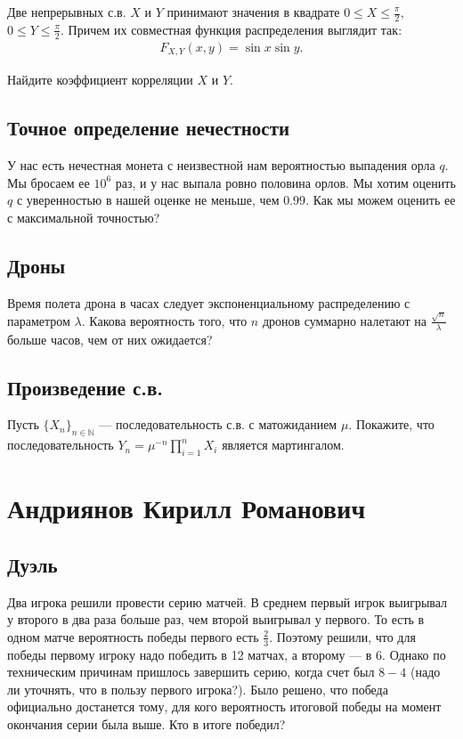 \documentclass[12pt]{article}
\newcommand\N{\mathbb{N}}
\begin{document}
Две непрерывных с.в. $X$ и $Y$ принимают значения в квадрате $0 \le X \le \frac{\pi}{2},$ $0 \le Y \le \frac{\pi}{2}$. Причем их совместная функция распределения выглядит так:
\begin{align*}
    F_{X, Y} (x, y) = \sin x \sin y.
\end{align*}

Найдите коэффициент корреляции $X$ и $Y$.



\subsection{Точное определение нечестности}

У нас есть нечестная монета с неизвестной нам вероятностью выпадения орла $q$. Мы бросаем ее $10^6$ раз, и у нас выпала ровно половина орлов. Мы хотим оценить $q$ с уверенностью в нашей оценке не меньше, чем $0.99$. Как мы можем оценить ее с максимальной точностью? 



\subsection{Дроны}

Время полета дрона в часах следует экспоненциальному распределению с параметром $\lambda$. Какова вероятность того, что $n$ дронов суммарно налетают на $\frac{\sqrt{n}}{\lambda}$ больше часов, чем от них ожидается?



\subsection{Произведение с.в.}

Пусть $\{X_n\}_{n \in \N}$ --- последовательность с.в. с матожиданием $\mu$. Покажите, что последовательность $Y_n = \mu^{-n} \prod_{i = 1}^n X_i$ является мартингалом.



\newpage
\section{Андриянов Кирилл Романович}

\subsection{Дуэль}

Два игрока решили провести серию матчей. В среднем первый игрок выигрывал у второго в два раза больше раз, чем второй выигрывал у первого. То есть в одном матче вероятность победы первого есть $\frac{2}{3}$. Поэтому решили, что для победы первому игроку надо победить в 12 матчах, а второму --- в 6. Однако по техническим причинам пришлось завершить серию, когда счет был $8-4$ (надо ли уточнять, что в пользу первого игрока?). Было решено, что победа официально достанется тому, для кого вероятность итоговой победы на момент окончания серии была выше. Кто в итоге победил?
\end{document}
